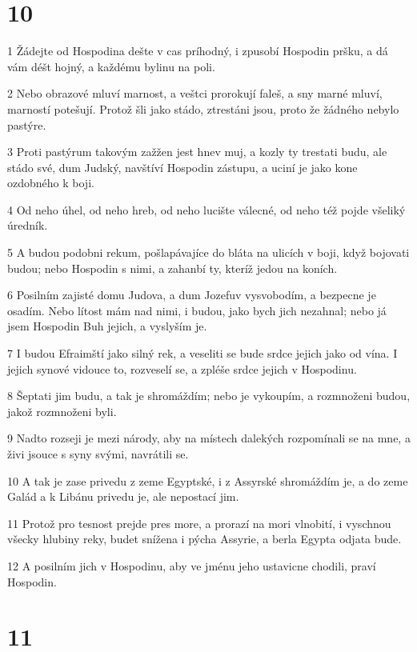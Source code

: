 \chapter{10}

\par 1 Žádejte od Hospodina dešte v cas príhodný, i zpusobí Hospodin pršku, a dá vám déšt hojný, a každému bylinu na poli.
\par 2 Nebo obrazové mluví marnost, a veštci prorokují faleš, a sny marné mluví, marností potešují. Protož šli jako stádo, ztrestáni jsou, proto že žádného nebylo pastýre.
\par 3 Proti pastýrum takovým zažžen jest hnev muj, a kozly ty trestati budu, ale stádo své, dum Judský, navštíví Hospodin zástupu, a uciní je jako kone ozdobného k boji.
\par 4 Od neho úhel, od neho hreb, od neho lucište válecné, od neho též pojde všeliký úredník.
\par 5 A budou podobni rekum, pošlapávajíce do bláta na ulicích v boji, když bojovati budou; nebo Hospodin s nimi, a zahanbí ty, kteríž jedou na koních.
\par 6 Posilním zajisté domu Judova, a dum Jozefuv vysvobodím, a bezpecne je osadím. Nebo lítost mám nad nimi, i budou, jako bych jich nezahnal; nebo já jsem Hospodin Buh jejich, a vyslyším je.
\par 7 I budou Efraimští jako silný rek, a veseliti se bude srdce jejich jako od vína. I jejich synové vidouce to, rozveselí se, a zpléše srdce jejich v Hospodinu.
\par 8 Šeptati jim budu, a tak je shromáždím; nebo je vykoupím, a rozmnoženi budou, jakož rozmnoženi byli.
\par 9 Nadto rozseji je mezi národy, aby na místech dalekých rozpomínali se na mne, a živi jsouce s syny svými, navrátili se.
\par 10 A tak je zase privedu z zeme Egyptské, i z Assyrské shromáždím je, a do zeme Galád a k Libánu privedu je, ale nepostací jim.
\par 11 Protož pro tesnost prejde pres more, a prorazí na mori vlnobití, i vyschnou všecky hlubiny reky, budet snížena i pýcha Assyrie, a berla Egypta odjata bude.
\par 12 A posilním jich v Hospodinu, aby ve jménu jeho ustavicne chodili, praví Hospodin.

\chapter{11}

